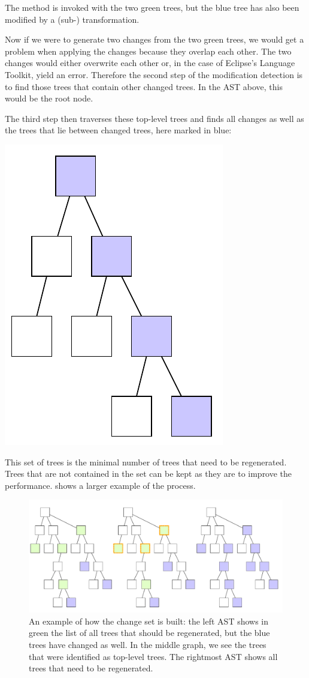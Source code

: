 The  method is invoked with the two green trees, but the blue tree has also been modified by a (sub-) transformation.

Now if we were to generate two changes from the two green trees, we would get a problem when applying the changes because they overlap each other. The two changes would either overwrite each other or, in the case of Eclipse's Language Toolkit, yield an error. Therefore the second step of the modification detection is to find those trees that contain other changed trees. In the AST above, this would be the root node.

The third step then traverses these top-level trees and finds all changes as well as the trees that lie between changed trees, here marked in blue:

\begin{center}
\includegraphics[width=0.2\linewidth]{ast_with_changeset.pdf}
\end{center}

This set of trees is the minimal number of trees that need to be regenerated. Trees that are not contained in the set can be kept as they are to improve the performance.  shows a larger example of the process.

\begin{figure}
 \centering
 \includegraphics[width=\linewidth]{ast_with_changes_large.pdf}
 \caption{An example of how the change set is built: the left AST shows in green the list of all trees that should be regenerated, but the blue trees have changed as well. In the middle graph, we see the trees that were identified as top-level trees. The rightmost AST shows all trees that need to be regenerated.}
 \label{figure:ast_with_changes_large}
\end{figure}

